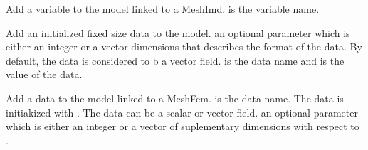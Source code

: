 \documentclass[a4paper,11pt,english]{sphinxmanual}
\begin{document}
\begin{fulllineitems}

\begin{fulllineitems}
\label{\detokenize{python/cmdref_Model:getfem.Model.add_im_variable}}
Add a variable to the model linked to a MeshImd.  is the variable
name.

\end{fulllineitems}


\begin{fulllineitems}
\label{\detokenize{python/cmdref_Model:getfem.Model.add_initialized_data}}
Add an initialized fixed size data to the model.  an
optional parameter which is either an 
integer  or a vector dimensions that describes the format of the
data. By default, the data is considered to b a vector field.
 is the data name and  is the value of the data.

\end{fulllineitems}


\begin{fulllineitems}
\label{\detokenize{python/cmdref_Model:getfem.Model.add_initialized_fem_data}}
Add a data to the model linked to a MeshFem.  is the data name.
The data is initiakized with . The data can be a scalar or vector
field.  an optional parameter which is either an 
integer or a vector of suplementary dimensions with respect to .

\end{fulllineitems}


\end{fulllineitems}
\end{document}
